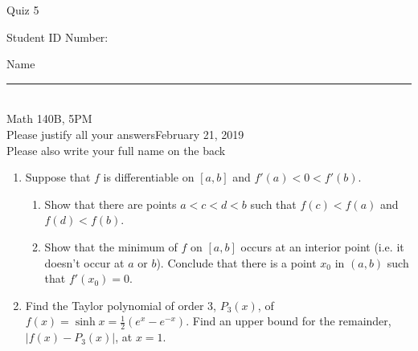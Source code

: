 \documentclass[12pt]{article}
\begin{document}
\begin{flushleft} 
\centerline{\LARGE{Quiz 5}} 
\vspace{5 mm}
{Student ID Number:}\hfill  
{Name \rule {2 in}{0.01in}}\\
Math 140B, 5PM
\\
{Please justify all your answers}\hfill {February 21, 2019}
\\
{Please also write your full name on the back} 

\medskip
\end{flushleft}

\begin{enumerate}
	\item Suppose that $f$ is differentiable on $[a,b]$ and $f'(a)<0<f'(b)$.
	\begin{enumerate}
		\item Show that there are points $a<c<d<b$ such that $f(c)<f(a)$ and $f(d)<f(b)$.
		\vfill
		\item Show that the minimum of $f$ on $[a,b]$ occurs at an interior point (i.e. it doesn't occur at $a$ or $b$). Conclude that there is a point $x_0$ in $(a,b)$ such that $f'(x_0) = 0$.
		\vfill
	\end{enumerate}
	\item Find the Taylor polynomial of order 3, $P_3(x)$, of $f(x) = \sinh x = \frac{1}{2}(e^{x}-e^{-x})$. Find an upper bound for the remainder, $|f(x)-P_3(x)|$, at $x = 1$.
	\vfill
\end{enumerate}

\end{document}
